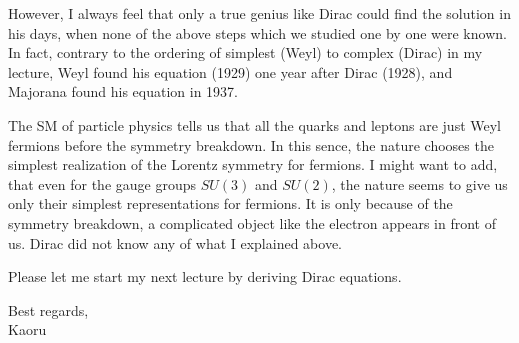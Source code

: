 \documentclass[12pt]{article}
\begin{document}
  However, I always feel that only a true genius like Dirac could find
  the solution in his days, when none of the above steps which we
  studied one by one were known.  In fact, contrary to the ordering of
  simplest (Weyl) to complex (Dirac) in my lecture, Weyl found his
  equation (1929) one year after Dirac (1928), and Majorana found
  his equation in 1937.

  The SM of particle physics tells us that all the quarks and leptons
  are just Weyl fermions before the symmetry breakdown.  In this sence,
  the nature chooses the simplest realization of the Lorentz symmetry
  for fermions.  I might want to add, that even for the gauge groups
  $SU(3)$ and $SU(2)$, the nature seems to give us only their simplest
  representations for fermions.  It is only because of the symmetry
  breakdown, a complicated object like the electron appears in front
  of us.  Dirac did not know any of what I explained above.

  Please let me start my next lecture by deriving Dirac equations.

Best regards,\\

Kaoru
\end{document}
